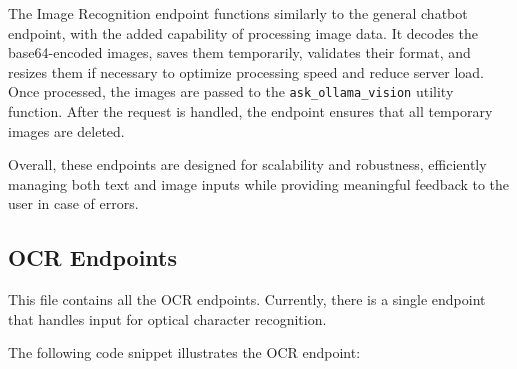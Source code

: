 The Image Recognition endpoint functions similarly to the general chatbot endpoint, with the added capability of processing image data. It decodes the base64-encoded images, saves them temporarily, validates their format, and resizes them if necessary to optimize processing speed and reduce server load. Once processed, the images are passed to the \texttt{ask\_ollama\_vision} utility function. After the request is handled, the endpoint ensures that all temporary images are deleted.

Overall, these endpoints are designed for scalability and robustness, efficiently managing both text and image inputs while providing meaningful feedback to the user in case of errors.


\subsection{OCR Endpoints}

This file contains all the OCR endpoints. Currently, there is a single endpoint that handles input for optical character recognition.

The following code snippet illustrates the OCR endpoint:

